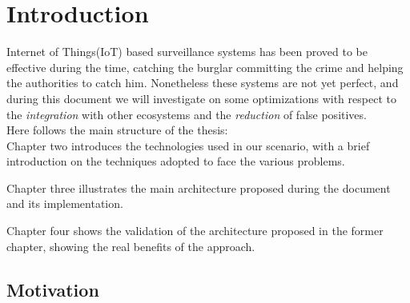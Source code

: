 \chapter{Introduction}

Internet of Things(IoT) based surveillance systems has been proved to be effective during the time,
catching the burglar committing the crime and helping the authorities to
catch him\cite{fbrobbery}. Nonetheless these systems are not yet perfect, and during
this document we will investigate on some optimizations with respect to
the \textit{integration} with other ecosystems and the \textit{reduction}
of false positives.\\
Here follows the main structure of the thesis:\\

Chapter two introduces the technologies used in our scenario, with a brief
introduction on the techniques adopted to face the various problems.

Chapter three illustrates the main architecture proposed
during the document and its implementation.

Chapter four shows the validation of the architecture proposed in the former
chapter, showing the real benefits of the approach.


\section{Motivation}

